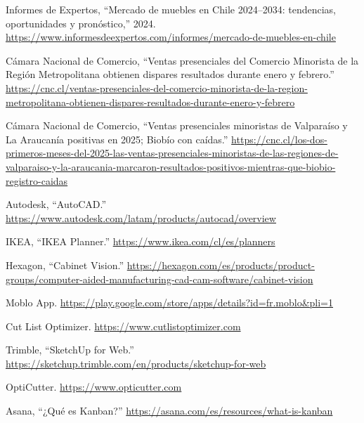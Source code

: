 \documentclass[12pt,oneside]{article}
\begin{document}
\noindent [2] Informes de Expertos, “Mercado de muebles en Chile 2024–2034: tendencias, oportunidades y pronóstico,” 2024. \url{https://www.informesdeexpertos.com/informes/mercado-de-muebles-en-chile} \vspace{0.5em}

\noindent [3] Cámara Nacional de Comercio, “Ventas presenciales del Comercio Minorista de la Región Metropolitana obtienen dispares resultados durante enero y febrero.” \url{https://cnc.cl/ventas-presenciales-del-comercio-minorista-de-la-region-metropolitana-obtienen-dispares-resultados-durante-enero-y-febrero} \vspace{0.5em}

\noindent [4] Cámara Nacional de Comercio, “Ventas presenciales minoristas de Valparaíso y La Araucanía positivas en 2025; Biobío con caídas.” \url{https://cnc.cl/los-dos-primeros-meses-del-2025-las-ventas-presenciales-minoristas-de-las-regiones-de-valparaiso-y-la-araucania-marcaron-resultados-positivos-mientras-que-biobio-registro-caidas} \vspace{0.5em}

\noindent [5] Autodesk, “AutoCAD.” \url{https://www.autodesk.com/latam/products/autocad/overview} \vspace{0.5em}

\noindent [6] IKEA, “IKEA Planner.” \url{https://www.ikea.com/cl/es/planners} \vspace{0.5em}

\noindent [7] Hexagon, “Cabinet Vision.” \url{https://hexagon.com/es/products/product-groups/computer-aided-manufacturing-cad-cam-software/cabinet-vision} \vspace{0.5em}

\noindent [8] Moblo App. \url{https://play.google.com/store/apps/details?id=fr.moblo&pli=1} \vspace{0.5em}

\noindent [9] Cut List Optimizer. \url{https://www.cutlistoptimizer.com} \vspace{0.5em}

\noindent [10] Trimble, “SketchUp for Web.” \url{https://sketchup.trimble.com/en/products/sketchup-for-web} \vspace{0.5em}

\noindent [11] OptiCutter. \url{https://www.opticutter.com} \vspace{0.5em}

\noindent [12] Asana, “¿Qué es Kanban?” \url{https://asana.com/es/resources/what-is-kanban} \vspace{0.5em}
\end{document}
